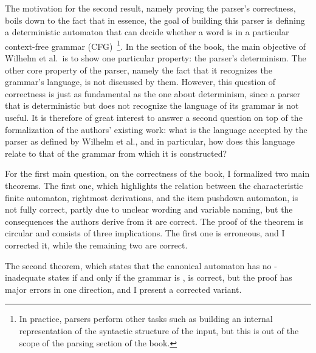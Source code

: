 \begin{isabellebody}
\begin{isamarkuptext}
The motivation for the second result, namely proving the parser's correctness, boils down to the
fact that in essence, the goal of building this parser is defining a deterministic automaton
that can decide whether a word is in a particular context-free grammar 
(CFG)~\footnote{In practice, parsers perform other tasks
such as building an internal representation of the syntactic structure of the input, but this is out
of the scope of the  parsing section of the book.}. In the  section of the book, the
main objective of Wilhelm et al.\ is to show one particular property: the parser's determinism. The
other core property of the parser, namely the fact that it recognizes the grammar's language, is not
discussed by them. However, this question of correctness is just as fundamental as the one about
determinism, since a parser that is deterministic but does not recognize the language of its grammar
is not useful. It is therefore of great interest to answer a second question on top of the formalization
of the authors' existing work: what is the language accepted by the  parser as defined by
Wilhelm et al., and in particular, how does this language relate to that of the grammar from which it
is constructed?

For the first main question, on the correctness of the book, I formalized two main theorems. 
The first one, which highlights the relation between the characteristic finite automaton, rightmost
derivations, and the item pushdown automaton, is not fully correct, partly due to unclear wording
and variable naming, but the consequences the authors derive from it are correct. The proof
of the theorem is circular and consists of three implications. The first one is erroneous, and I
corrected it, while the remaining two are correct.

The second theorem, which states that the canonical  automaton has no -inadequate states
if and only if the grammar is , is correct, but the proof has major errors in one direction,
and I present a corrected variant. 


\end{isamarkuptext}
\end{isabellebody}

